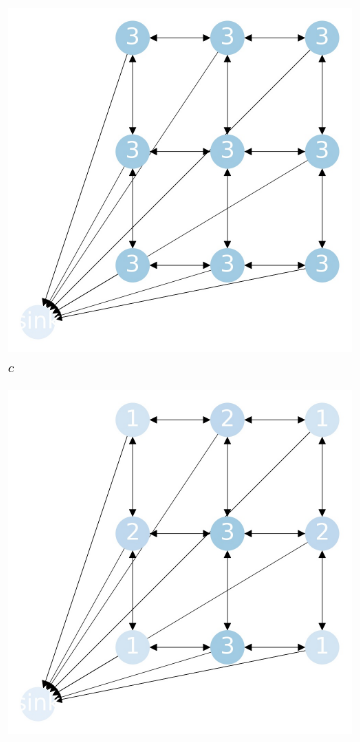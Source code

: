 \documentclass{beamer}
\begin{document}
\begin{frame}
  \begin{figure}[h!]
    \centering
    \begin{subfigure}[b]{0.3\linewidth}
      \includegraphics[width=\linewidth]{sandpile_chip_fire_0}
      \caption{$c$}
    \end{subfigure}
    \begin{subfigure}[b]{0.3\linewidth}
      \includegraphics[width=\linewidth]{sandpile_chip_fire_1p}

\end{subfigure}
\end{figure}
\end{frame}
\end{document}
